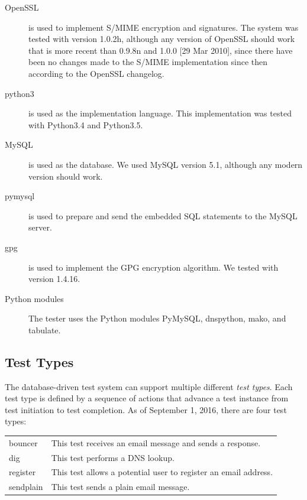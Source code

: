 \documentclass[preprint,3p]{elsarticle}
\begin{document}
\begin{description}
\item[OpenSSL] is used to implement S/MIME encryption and
signatures. The system was tested with version 1.0.2h, although any
version of OpenSSL should work that is more recent than 0.9.8n and
1.0.0 [29 Mar 2010], since there have been no changes made to the
S/MIME implementation since then according to the OpenSSL changelog. 

\item[python3] is used as the implementation language. This
implementation was tested with Python3.4 and Python3.5. 

\item[MySQL] is used as the database. We used MySQL version 5.1,
although any modern version should work. 

\item[pymysql] is used to prepare and send the embedded SQL
statements to the MySQL server.

\item[gpg] is used to implement the GPG encryption
algorithm. We tested with version 1.4.16.

\item[Python modules] The tester uses the Python modules PyMySQL,
dnspython, mako, and tabulate.
\end{description}

\subsection{Test Types}
The database-driven test system can support multiple different
\emph{test types}. Each test type is defined by a sequence of actions
that advance a test instance from test initiation to test
completion. As of September 1, 2016, there are four test types:\\

\begin{center}
\begin{tabularx}{\linewidth}{lX}
bouncer &  This test receives an email message and sends a response. \\
dig     &  This test performs a DNS lookup.\\
register &  This test allows a potential user to register an email address. \\
sendplain & This test sends a plain email message.\\
\end{tabularx}
\end{center}
\end{document}
